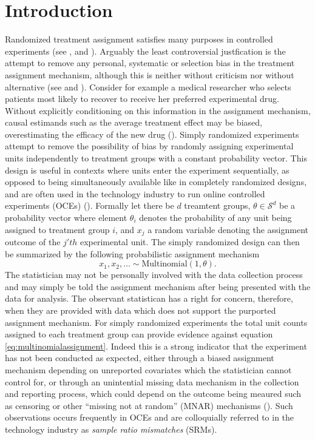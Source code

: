 \documentclass[11pt]{article}
\begin{document}
\section{Introduction}
Randomized treatment assignment satisfies many purposes in controlled experiments (see \cite{kempthorne}, \cite{cox} and \cite{rubin}). Arguably the least controversial justfication is the attempt to remove any personal, systematic or selection bias in the treatment assignment mechanism, although this is neither without criticism nor without alternative (see \cite{lindley} and \cite{kadane}). Consider for example a medical researcher who selects patients most likely to recover to receive her preferred experimental drug. Without explicitly conditioning on this information in the assignment mechanism, causal estimands such as the average treatment effect may be biased, overestimating the efficacy of the new drug (\cite{berry}).
Simply randomized experiments attempt to remove the possibility of bias by randomly assigning experimental units independently to treatment groups with a constant probability vector.
This design is useful in contexts where units enter the experiment sequentially, as opposed to being simultaneously available like in completely randomized designs, and are often used in the technology industry to run online controlled experiments (OCEs) (\cite{oce}). Formally let there be $d$ treamtent groups, $\theta \in \mathcal{S}^d$ be a probability vector where element $\theta_i$ denotes the probability of any unit being assigned to treatment group $i$, and $x_j$ a random variable denoting the assignment outcome of the $j'th$ experimental unit. The simply randomized design can then be summarized by the following probabilistic assignment mechanism
\begin{equation}
  \label{eq:multinomialassignment}
  x_1,x_2, \dots \sim \text{Multinomial}(1,\theta).
\end{equation}
The statistician may not be personally involved with the data collection process and may simply be told the assignment mechanism after being presented with the data for analysis. The observant statistican has a right for concern, therefore, when they are provided with data which does not support the purported assignment mechanism. For simply randomized experiments the total unit counts assigned to each treatment group can provide evidence against equation \eqref{eq:multinomialassignment}.
Indeed this is a strong indicator that the experiment has not been conducted as expected, either through a biased assignment mechanism depending on unreported covariates which the statistician cannot control for, or through an unintential missing data mechanism in the collection and reporting process, which could depend on the outcome being meaured such as censoring or other ``missing not at random'' (MNAR) mechanisms (\cite{missing-data}).
Such observations occurs frequently in OCEs and are colloquially referred to in the technology industry as \textit{sample ratio mismatches} (SRMs).
\end{document}
